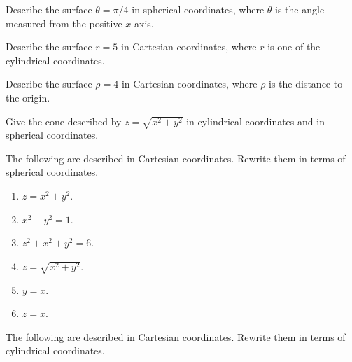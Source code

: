 \begin{enumialphparenastyle}
\begin{ex} Describe the surface $\theta =\pi /4$ in spherical coordinates, where $\theta $ is
the angle measured from the positive $x$ axis. 
\end{ex}

\begin{ex} Describe the surface $r=5$ in Cartesian coordinates, where 
$r$ is one of the cylindrical coordinates.
\end{ex}

\begin{ex} Describe the surface $\rho =4$ in Cartesian coordinates, 
where $\rho $ is the distance to the origin.
\end{ex}

\begin{ex} Give the cone described by $z=\sqrt{x^{2}+y^{2}}$ in cylindrical coordinates and
in spherical coordinates.
\end{ex}

\begin{ex} The following are described in Cartesian coordinates. Rewrite them in terms of spherical coordinates.

\begin{enumerate}
\item $z=x^{2}+y^{2}$.

\item $x^{2}-y^{2}=1$.

\item $z^{2}+x^{2}+y^{2}=6$.

\item $z=\sqrt{x^{2}+y^{2}}$.

\item $y=x$.

\item $z=x$.
\end{enumerate}
\end{ex}

\begin{ex} The following are described in Cartesian coordinates. Rewrite them in terms of cylindrical coordinates.


\end{ex}
\end{enumialphparenastyle}
